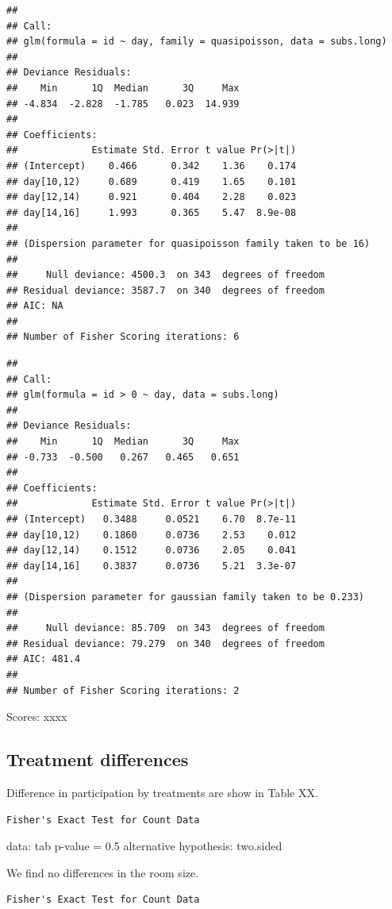 \documentclass[12pt,]{article}
\begin{document}
\begin{verbatim}
## 
## Call:
## glm(formula = id ~ day, family = quasipoisson, data = subs.long)
## 
## Deviance Residuals: 
##    Min      1Q  Median      3Q     Max  
## -4.834  -2.828  -1.785   0.023  14.939  
## 
## Coefficients:
##             Estimate Std. Error t value Pr(>|t|)
## (Intercept)    0.466      0.342    1.36    0.174
## day[10,12)     0.689      0.419    1.65    0.101
## day[12,14)     0.921      0.404    2.28    0.023
## day[14,16]     1.993      0.365    5.47  8.9e-08
## 
## (Dispersion parameter for quasipoisson family taken to be 16)
## 
##     Null deviance: 4500.3  on 343  degrees of freedom
## Residual deviance: 3587.7  on 340  degrees of freedom
## AIC: NA
## 
## Number of Fisher Scoring iterations: 6
\end{verbatim}

\begin{verbatim}
## 
## Call:
## glm(formula = id > 0 ~ day, data = subs.long)
## 
## Deviance Residuals: 
##    Min      1Q  Median      3Q     Max  
## -0.733  -0.500   0.267   0.465   0.651  
## 
## Coefficients:
##             Estimate Std. Error t value Pr(>|t|)
## (Intercept)   0.3488     0.0521    6.70  8.7e-11
## day[10,12)    0.1860     0.0736    2.53    0.012
## day[12,14)    0.1512     0.0736    2.05    0.041
## day[14,16]    0.3837     0.0736    5.21  3.3e-07
## 
## (Dispersion parameter for gaussian family taken to be 0.233)
## 
##     Null deviance: 85.709  on 343  degrees of freedom
## Residual deviance: 79.279  on 340  degrees of freedom
## AIC: 481.4
## 
## Number of Fisher Scoring iterations: 2
\end{verbatim}

Scores: xxxx

\subsection{Treatment differences}\label{treatment-differences}

Difference in participation by treatments are show in Table XX.

\begin{verbatim}
Fisher's Exact Test for Count Data
\end{verbatim}

data: tab p-value = 0.5 alternative hypothesis: two.sided

We find no differences in the room size.

\begin{verbatim}
Fisher's Exact Test for Count Data
\end{verbatim}
\end{document}
